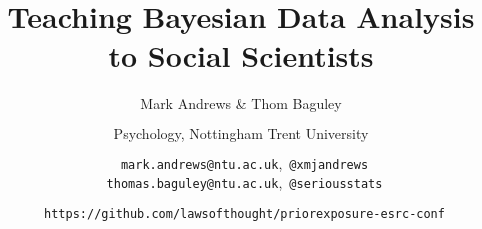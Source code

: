 \documentclass{slides}
\title[Teaching Bayes]{Teaching Bayesian Data Analysis to Social Scientists}
\author[Andrews]{Mark Andrews \& Thom Baguley \\ 
$\phantom{foo}$ \\ 
Psychology, Nottingham Trent University \\ 
$\phantom{foo}$ \\ 
\faEnvelopeO \  \texttt{mark.andrews@ntu.ac.uk},\  \faTwitter \texttt{@xmjandrews} \\ 
\faEnvelopeO \  \texttt{thomas.baguley@ntu.ac.uk},\ \faTwitter \texttt{@seriousstats}  \\ 
$\phantom{foo}$ \\ \faGithub \ \texttt{https://github.com/lawsofthought/priorexposure-esrc-conf}}
\date{}
\begin{document}
{
	\begin{frame}
		\titlepage
	\end{frame}
}




\end{document}
